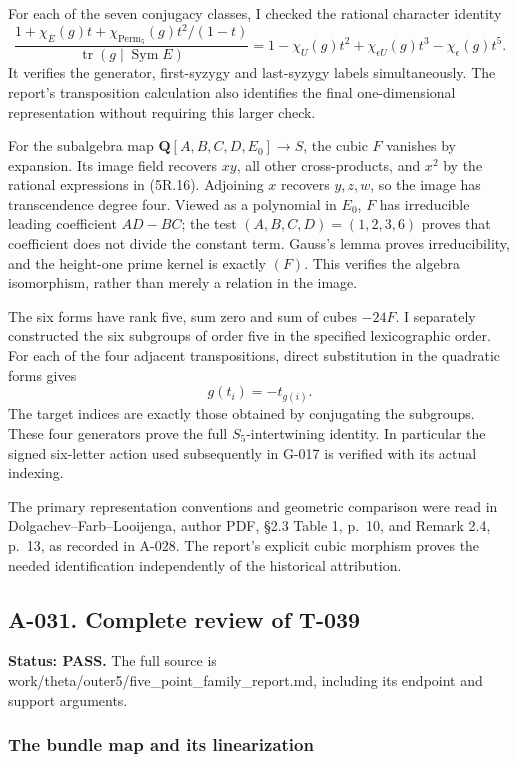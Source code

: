 \documentclass[
  10pt,
]{article}
\begin{document}
For each of the seven conjugacy classes, I checked the rational
character identity \[
\frac{1+\chi_E(g)t+\chi_{\operatorname{Perm}_5}(g)t^2/(1-t)}
     {\operatorname{tr}(g\mid\operatorname{Sym}E)}
=1-\chi_U(g)t^2+\chi_{\epsilon U}(g)t^3-\chi_\epsilon(g)t^5.
\] It verifies the generator, first-syzygy and last-syzygy labels
simultaneously. The report's transposition calculation also identifies
the final one-dimensional representation without requiring this larger
check.

For the subalgebra map \(\mathbf Q[A,B,C,D,E_0]\to S\), the cubic \(F\)
vanishes by expansion. Its image field recovers \(xy\), all other
cross-products, and \(x^2\) by the rational expressions in (5R.16).
Adjoining \(x\) recovers \(y,z,w\), so the image has transcendence
degree four. Viewed as a polynomial in \(E_0\), \(F\) has irreducible
leading coefficient \(AD-BC\); the test \((A,B,C,D)=(1,2,3,6)\) proves
that coefficient does not divide the constant term. Gauss's lemma proves
irreducibility, and the height-one prime kernel is exactly \((F)\). This
verifies the algebra isomorphism, rather than merely a relation in the
image.

The six forms have rank five, sum zero and sum of cubes \(-24F\). I
separately constructed the six subgroups of order five in the specified
lexicographic order. For each of the four adjacent transpositions,
direct substitution in the quadratic forms gives \[
g(t_i)=-t_{g(i)}.
\] The target indices are exactly those obtained by conjugating the
subgroups. These four generators prove the full \(S_5\)-intertwining
identity. In particular the signed six-letter action used subsequently
in G-017 is verified with its actual indexing.

The primary representation conventions and geometric comparison were
read in Dolgachev--Farb--Looijenga, author PDF, §2.3 Table 1, p.~10, and
Remark 2.4, p.~13, as recorded in A-028. The report's explicit cubic
morphism proves the needed identification independently of the
historical attribution.

\subsection{A-031. Complete review of
T-039}\label{a-031.-complete-review-of-t-039}

\textbf{Status: PASS.} The full source is
work/theta/outer5/five\_point\_family\_report.md, including its endpoint
and support arguments.

\subsubsection{The bundle map and its
linearization}\label{the-bundle-map-and-its-linearization}
\end{document}
